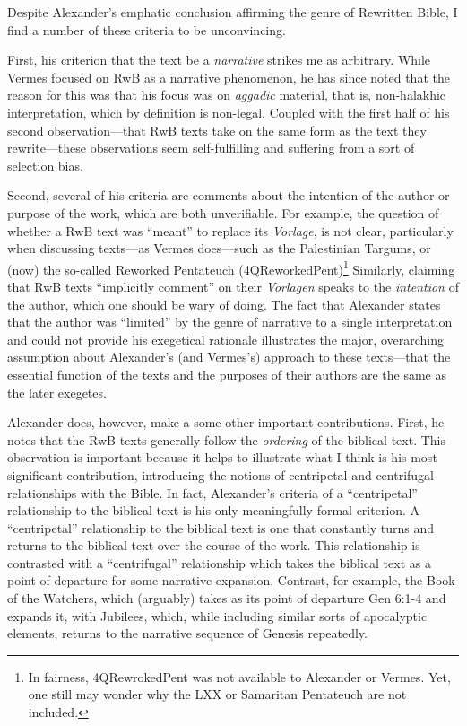 Despite Alexander's emphatic conclusion affirming the genre of
Rewritten Bible, I find a number of these criteria to be unconvincing.

First, his criterion that the text be a \emph{narrative} strikes me as
arbitrary. While Vermes focused on RwB as a narrative phenomenon, he has
since noted that the reason for this was that his focus was on
\emph{aggadic} material, that is, non-halakhic interpretation, which by
definition is non-legal. Coupled with the first half of his second
observation---that RwB texts take on the same form as the text they
rewrite---these observations seem self-fulfilling and suffering from a
sort of selection bias.\autocite[Although, all of the texts he surveyed
are narratives, this fact illustrates one of the major shortcomings in
Alexander's method, specifically, that his conclusions were based on
four texts ``normally included in the genre.'' Therefore the selection
of these four texts was the result of a deductive selection, in part,
based on their narrative form.][99]{alexander_carson-williamson1988}

Second, several of his criteria are comments about the intention of the
author or purpose of the work, which are both unverifiable. For example,
the question of whether a RwB text was ``meant'' to replace its
\emph{Vorlage}, is not clear, particularly when discussing texts---as
Vermes does---such as the Palestinian Targums, or (now) the so-called
Reworked Pentateuch (4QReworkedPent)\footnote{In fairness,
  4QRewrokedPent was not available to Alexander or Vermes. Yet, one
  still may wonder why the LXX or Samaritan Pentateuch are not included.}
Similarly, claiming that RwB texts ``implicitly comment'' on their
\emph{Vorlagen} speaks to the \emph{intention} of the author, which one
should be wary of doing. The fact that Alexander states that the author
was ``limited'' by the genre of narrative to a single interpretation and
could not provide his exegetical rationale illustrates the major,
overarching assumption about Alexander's (and Vermes's) approach to
these texts---that the essential function of the texts and the purposes
of their authors are the same as the later exegetes.

Alexander does, however, make a some other important contributions.
First, he notes that the RwB texts generally follow the \emph{ordering}
of the biblical text. This observation is important because it helps to
illustrate what I think is his most significant contribution,
introducing the notions of centripetal and centrifugal relationships
with the Bible. In fact, Alexander's criteria of a ``centripetal''
relationship to the biblical text is his only meaningfully formal
criterion. A ``centripetal'' relationship to the biblical text is one
that constantly turns and returns to the biblical text over the course
of the work. This relationship is contrasted with a ``centrifugal''
relationship which takes the biblical text as a point of departure for
some narrative expansion. Contrast, for example, the Book of the
Watchers, which (arguably) takes as its point of departure Gen 6:1-4 and
expands it, with Jubilees, which, while including similar sorts of
apocalyptic elements, returns to the narrative sequence of Genesis
repeatedly.

